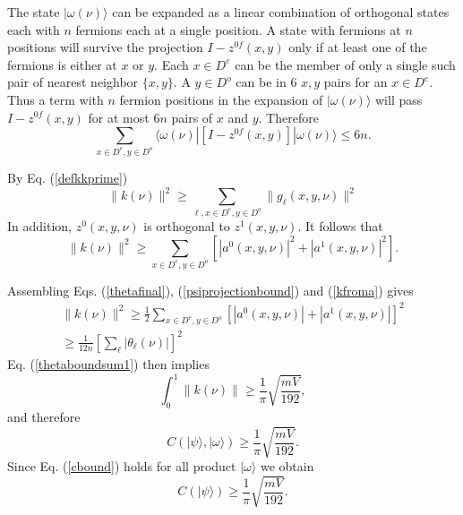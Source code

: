 \documentclass[12pt,amsmath,amssymb,onecolumn]{revtex4-2}
\begin{document}
The state $|\omega(\nu) \rangle $ can be expanded as a linear combination of orthogonal states 
each with 
$n$ fermions each at a single position. A state with fermions at $n$
positions will survive the projection
$I - z^{0f}(x,y)$ only if at least one of the fermions is either at $x$ or $y$.
Each $x \in D^e$ can be the member of only a single such pair of nearest
neighbor $\{x, y\}$. A $y \in D^o$ can be in 6 $x, y$ pairs for an
$x \in D^e$. Thus a term with $n$ fermion positions in the
expansion of $|\omega(\nu) \rangle $ will pass $I - z^{0f}(x,y)$ for 
at most $6n$ pairs of $x$ and $y$. Therefore 
\begin{equation}
\label{psiprojectionbound}
\sum_{x \in D^e, y \in D^o}  \langle \omega(\nu)| [I - z^{0f}(x,y)]|\omega(\nu) \rangle  \le 6n.
\end{equation}




By Eq. (\ref{defkkprime}) 
\begin{equation}
\label{kfroma0}
\parallel k(\nu) \parallel ^ 2  \ge  \sum_{\ell, x \in D^e, y \in D^o} \parallel g_\ell( x, y, \nu) \parallel^2
\end{equation}
In addition, $z^0(x,y,\nu)$ is orthogonal
to $z^1(x, y, \nu)$. It follows that
\begin{equation}
\label{kfroma}
\parallel k(\nu) \parallel^2 \ge \sum_{x \in D^e, y \in D^o} [|a^0(x,y,\nu)|^2 + |a^1(x,y,\nu)|^2].
\end{equation}




Assembling Eqs. (\ref{thetafinal}), (\ref{psiprojectionbound})
and (\ref{kfroma}) gives
\begin{multline}
\label{kbound}
\parallel k(\nu) \parallel^2 \ge \frac{1}{2} \sum_{x \in D^e, y \in D^o} [|a^0(x,y,\nu)| + |a^1(x,y,\nu)|]^2 \\
\ge \frac{1}{12 n} [\sum_{\ell} |\theta_{\ell}(\nu)|] ^ 2
\end{multline}
Eq. (\ref{thetaboundsum1}) then implies
\begin{equation}
\label{kbound1}
\int_0^1 \parallel k(\nu) \parallel \ge \frac{1}{\pi} \sqrt{ \frac{ mV}{192}},
\end{equation}
and therefore
\begin{equation}
\label{cbound}
C( |\psi \rangle , |\omega \rangle ) \ge \frac{1}{\pi}\sqrt{ \frac{ mV}{192}}.
\end{equation}
Since Eq. (\ref{cbound}) holds for all product $|\omega \rangle $
we obtain
\begin{equation}
\label{cbound2}
C( |\psi \rangle ) \ge \frac{1}{\pi} \sqrt{ \frac{ mV}{192}}.
\end{equation}
\end{document}
